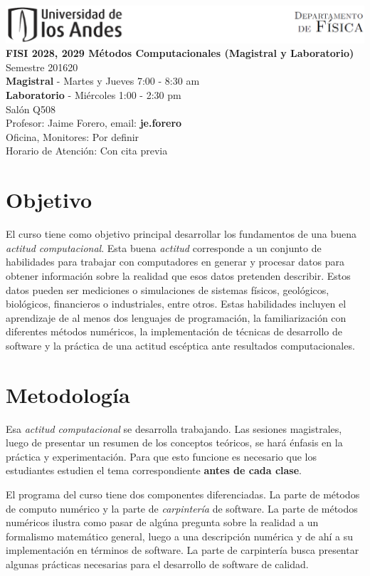 \documentclass[11pt]{article}
\begin{document}
\includegraphics[width=490pt]{header.png}\\[0.5cm]

\noindent
\textbf{FISI 2028, 2029 Métodos Computacionales (Magistral y Laboratorio)} 
Semestre 201620\\
\textbf{Magistral} - Martes y Jueves 7:00 - 8:30 am \\
\textbf{Laboratorio} - Mi\'ercoles 1:00 - 2:30 pm \\
Salón Q508\\
Profesor: Jaime Forero, email: \textbf{je.forero}\\
Oficina, Monitores: Por definir\\
Horario de Atención: Con cita previa


\section*{Objetivo}
El curso tiene como objetivo principal desarrollar los fundamentos 
de una buena \emph{actitud computacional}.  
Esta buena \emph{actitud} corresponde a un conjunto de habilidades para
trabajar con computadores en generar y procesar datos para obtener
informaci\'on sobre la realidad que esos datos pretenden
describir. 
Estos datos pueden ser mediciones o simulaciones de
sistemas f\'isicos, geol\'ogicos, biol\'ogicos, financieros o
industriales, entre otros.     
Estas habilidades incluyen el aprendizaje de al menos dos lenguajes de
programaci\'on, la familiarizaci\'on con diferentes m\'etodos num\'ericos, la
implementaci\'on de t\'ecnicas de desarrollo de software y la pr\'actica de una actitud esc\'eptica ante resultados computacionales.

\section*{Metodolog\'ia}
Esa \emph{actitud computacional} se desarrolla trabajando. 
Las sesiones magistrales, luego de presentar un resumen de los conceptos te\'oricos, se har\'a \'enfasis en la pr\'actica y experimentaci\'on. 
Para que esto  funcione es necesario que los estudiantes estudien el
tema correspondiente {\bf antes de cada clase}.  

El programa del curso tiene dos componentes diferenciadas. La parte de
m\'etodos de computo num\'erico y la parte de
\emph{carpinter\'ia} de software. 
La parte de m\'etodos num\'ericos ilustra como pasar de alg\'una
pregunta sobre la realidad a un formalismo
matem\'atico general, luego a una descripci\'on num\'erica y de ah\'i
a su implementaci\'on en t\'erminos de software.
La parte de carpinter\'ia busca presentar algunas pr\'acticas
necesarias para el desarrollo de software de calidad.
\end{document}
